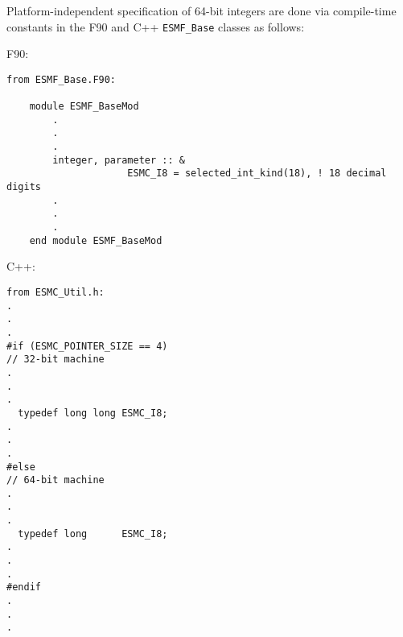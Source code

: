 
Platform-independent specification of 64-bit integers are done via
compile-time constants in the F90 and C++ {\tt ESMF\_Base} classes as follows:

F90:
\begin{verbatim}
from ESMF_Base.F90:

    module ESMF_BaseMod
        .
        .
        .
        integer, parameter :: &
                     ESMC_I8 = selected_int_kind(18), ! 18 decimal digits
        .
        .
        .
    end module ESMF_BaseMod
\end{verbatim}

C++:
\begin{verbatim}
from ESMC_Util.h:
.
.
.
#if (ESMC_POINTER_SIZE == 4)
// 32-bit machine
.
.
.
  typedef long long ESMC_I8;
.
.
.
#else
// 64-bit machine
.
.
.
  typedef long      ESMC_I8;
.
.
.
#endif
.
.
.
\end{verbatim}
